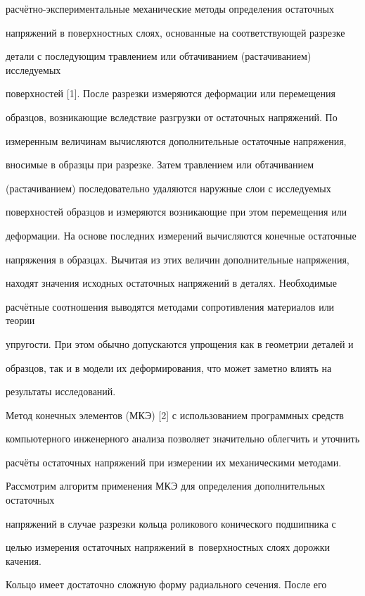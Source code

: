 расчётно-экспериментальные механические методы определения остаточных

напряжений в поверхностных слоях, основанные на соответствующей разрезке

детали с последующим травлением или обтачиванием (растачиванием) исследуемых

поверхностей [1]. После разрезки измеряются деформации или перемещения

образцов, возникающие вследствие разгрузки от остаточных напряжений. По

измеренным величинам вычисляются дополнительные остаточные напряжения,

вносимые в образцы при разрезке. Затем травлением или обтачиванием

(растачиванием) последовательно удаляются наружные слои с исследуемых

поверхностей образцов и измеряются возникающие при этом перемещения или

деформации. На основе последних измерений вычисляются конечные остаточные

напряжения в образцах. Вычитая из этих величин дополнительные напряжения,

находят значения исходных остаточных напряжений в деталях. Необходимые

расчётные соотношения выводятся методами сопротивления материалов или теории

упругости. При этом обычно допускаются упрощения как в геометрии деталей и

образцов, так и в модели их деформирования, что может заметно влиять на

результаты исследований.



Метод конечных элементов (МКЭ) [2] с использованием программных средств

компьютерного инженерного анализа позволяет значительно облегчить и уточнить

расчёты остаточных напряжений при измерении их механическими методами.

Рассмотрим алгоритм применения МКЭ для определения дополнительных остаточных

напряжений в случае разрезки кольца роликового конического подшипника с

целью измерения остаточных напряжений в~поверхностных слоях дорожки качения.



Кольцо имеет достаточно сложную форму радиального сечения. После его

